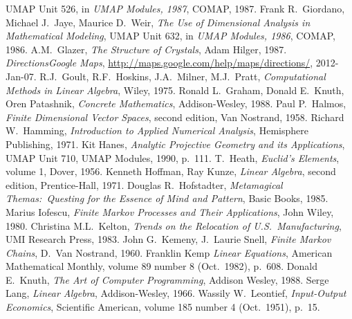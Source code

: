 \begin{thebibliography}{\makebox[2em][c]{{}\hfil{}}}
  UMAP Unit 526,
  in
  \emph{UMAP Modules, 1987},
  COMAP,
  1987.
  Frank R.~Giordano,  Michael J.~Jaye, Maurice D.~Weir,
  \emph{The Use of Dimensional Analysis in Mathematical Modeling}, 
  UMAP Unit 632,
  in
  \emph{UMAP Modules, 1986},
  COMAP,
  1986.
  A.M.~Glazer,
  \emph{The Structure of Crystals},
  Adam Hilger,
  1987.
  \emph{Directions\Dash Google Maps},
  \url{http://maps.google.com/help/maps/directions/},
  2012-Jan-07.
  R.J.~Goult, R.F.~Hoskins, J.A.~Milner, M.J.~Pratt,
  \emph{Computational Methods in Linear Algebra},
  Wiley,
  1975.
 Ronald L.~Graham, Donald E.~Knuth, Oren Patashnik,
 \emph{Concrete Mathematics},
 Addison-Wesley,
 1988.
  Paul P.~Halmos,
  \emph{Finite Dimensional Vector Spaces},
  second edition,
  Van Nostrand,
  1958.
  Richard W.\ Hamming,
  \emph{Introduction to Applied Numerical Analysis},
  Hemisphere Publishing,
  1971.
  Kit Hanes,
  \emph{Analytic Projective Geometry and its Applications},
  UMAP Unit 710,
  UMAP Modules, 1990,
  p.~111.
  T.\ Heath,
  \emph{Euclid's Elements},
  volume 1,
  Dover,
  1956.
  Kenneth Hoffman, Ray Kunze,
  \emph{Linear Algebra},
  second edition,
  Prentice-Hall,
  1971.
 Douglas R.~Hofstadter,
 \emph{Metamagical Themas:~Questing for the Essence of Mind and Pattern},
 Basic Books,
 1985.
  Marius Iofescu,
  \emph{Finite Markov Processes and Their Applications},
  John Wiley, 1980.
  Christina M.L.~Kelton,
  \emph{Trends on the Relocation of U.S.\ Manufacturing},
  UMI Research Press, 1983.
  John G.~Kemeny, J.~Laurie Snell,
  \emph{Finite Markov Chains},
  D.~Van Nostrand, 1960.
  Franklin Kemp
  \emph{Linear Equations},
  American Mathematical Monthly,
  volume 89 number 8 (Oct.\ 1982),
  p.~608.
  Donald E.~Knuth,
  \emph{The Art of Computer Programming},
  Addison Wesley,
  1988.     
  Serge Lang,
  \emph{Linear Algebra},
  Addison-Wesley,
  1966.
  Wassily W.\ Leontief,
  \emph{Input-Output Economics},
  Scientific American,
  volume 185 number 4 (Oct.\ 1951),
  p.~15. 

\end{thebibliography}

